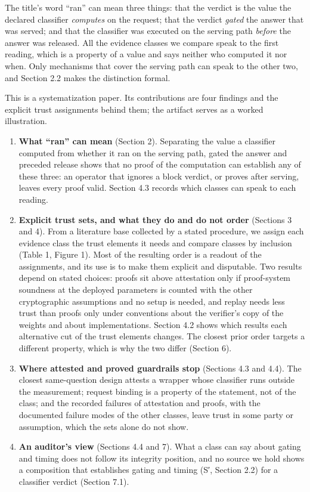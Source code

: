 \documentclass[11pt]{article}
\begin{document}
The title's word ``ran'' can mean three things: that the verdict is the value the declared classifier \emph{computes} on the request; that the verdict \emph{gated} the answer that was served; and that the classifier was executed on the serving path \emph{before} the answer was released. All the evidence classes we compare speak to the first reading, which is a property of a value and says neither who computed it nor when. Only mechanisms that cover the serving path can speak to the other two, and Section 2.2 makes the distinction formal.

This is a systematization paper. Its contributions are four findings and the explicit trust assignments behind them; the artifact serves as a worked illustration.

\begin{enumerate}
\item \textbf{What ``ran'' can mean} (Section 2). Separating the value a classifier computed from whether it ran on the serving path, gated the answer and preceded release shows that no proof of the computation can establish any of these three: an operator that ignores a block verdict, or proves after serving, leaves every proof valid. Section 4.3 records which classes can speak to each reading.
\item \textbf{Explicit trust sets, and what they do and do not order} (Sections 3 and 4). From a literature base collected by a stated procedure, we assign each evidence class the trust elements it needs and compare classes by inclusion (Table 1, Figure 1). Most of the resulting order is a readout of the assignments, and its use is to make them explicit and disputable. Two results depend on stated choices: proofs sit above attestation only if proof-system soundness at the deployed parameters is counted with the other cryptographic assumptions and no setup is needed, and replay needs less trust than proofs only under conventions about the verifier's copy of the weights and about implementations. Section 4.2 shows which results each alternative cut of the trust elements changes. The closest prior order \cite{F9} targets a different property, which is why the two differ (Section 6).
\item \textbf{Where attested and proved guardrails stop} (Sections 4.3 and 4.4). The closest same-question design attests a wrapper whose classifier runs outside the measurement; request binding is a property of the statement, not of the class; and the recorded failures of attestation and proofs, with the documented failure modes of the other classes, leave trust in some party or assumption, which the sets alone do not show.
\item \textbf{An auditor's view} (Sections 4.4 and 7). What a class can say about gating and timing does not follow its integrity position, and no source we hold shows a composition that establishes gating and timing (S′, Section 2.2) for a classifier verdict (Section 7.1).
\end{enumerate}
\end{document}
